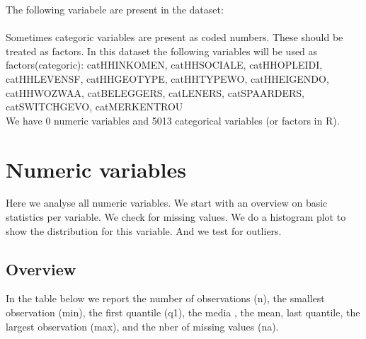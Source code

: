 \documentclass[10pt,a4paper,titlepage]{report}
\begin{document}
The following variabele are present in the dataset:\\
 
\\
Sometimes categoric variables are present as coded numbers. These should be treated as factors.
In this dataset the following variables will be used as factors(categoric): catHHINKOMEN, catHHSOCIALE, catHHOPLEIDI, catHHLEVENSF, catHHGEOTYPE, catHHTYPEWO, catHHEIGENDO, catHHWOZWAA, catBELEGGERS, catLENERS, catSPAARDERS, catSWITCHGEVO, catMERKENTROU
\\
We have 0 numeric variables and 5013 categorical variables (or factors in R).
\newpage
\section{Numeric variables}
Here we analyse all numeric variables. We start with an overview on basic statistics per variable. We check for missing values. We do a histogram plot to show the distribution for this variable. And we test for outliers.

\subsection{Overview}
In the table below we report the number of observations (n), the smallest observation (min),  the first quantile (q1), the media ,  the mean, last quantile, the largest observation (max), and the nber of missing values (na).\\

\begin{knitrout}
\color{fgcolor}\begin{kframe}


{\ttfamily\noindent\bfseries\color{errorcolor}{\#\# Error: there is no package called 'reporttools'}}

{\ttfamily\noindent\bfseries\color{errorcolor}{\#\# Error: could not find function "tableContinuous"}}\end{kframe}
\end{knitrout}


 
\begin{knitrout}
\color{fgcolor}\begin{kframe}


{\ttfamily\noindent\color{warningcolor}{\#\# Warning: cannot open file '1-data-understanding/CopyOfda-numeric-template.Rnw': No such file or directory}}

{\ttfamily\noindent\bfseries\color{errorcolor}{\#\# Error: cannot open the connection}}\end{kframe}
\end{knitrout}
\end{document}
